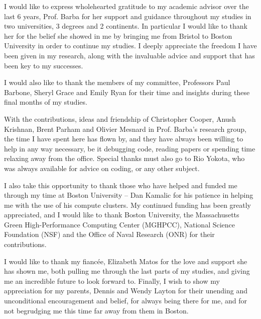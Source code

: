 
%
%

I would like to express wholehearted gratitude to my academic advisor over the last 6 years, Prof. Barba for her support and guidance throughout my studies in two universities, 3 degrees and 2 continents. In particular I would like to thank her for the belief she showed in me by bringing me from Bristol to Boston University in order to continue my studies. I deeply appreciate the freedom I have been given in my research, along with the invaluable advice and support that has been key to my successes.

I would also like to thank the members of my committee, Professors Paul Barbone, Sheryl Grace and Emily Ryan for their time and insights during these final months of my studies.

With the contributions, ideas and friendship of Christopher Cooper, Anush Krishnan, Brent Parham and Olivier Mesnard in Prof. Barba's research group, the time I have spent here has flown by, and they have always been willing to help in any way necessary, be it debugging code, reading papers or spending time relaxing away from the office. Special thanks must also go to Rio Yokota, who was always available for advice on coding, {\fmm} or any other subject.

I also take this opportunity to thank those who have helped and funded me through my time at Boston University -- Dan Kamalic for his patience in helping me with the use of his compute clusters. My continued funding has been greatly appreciated, and I would like to thank Boston University, the Massachusetts Green High-Performance Computing Center (MGHPCC), National Science Foundation (NSF) and the Office of Naval Research (ONR) for their contributions. 

I would like to thank my fianc\'ee, Elizabeth Matos for the love and support she has shown me, both pulling me through the last parts of my studies, and giving me an incredible future to look forward to. Finally, I wish to show my appreciation for my parents, Dennis and Wendy Layton for their unending and unconditional encouragement and belief, for always being there for me, and for not begrudging me this time far away from them in Boston. 
